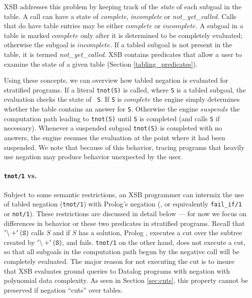 XSB addresses this problem by keeping track of the {\em state} of each
subgoal in the table.  A call can have a state of {\em complete}, {\em
incomplete} or {\em not\_yet\_called}.  
Calls that do have table entries may be either $complete$ or
$incomplete$.  A subgoal in a table is marked $complete$ only after it
is determined to be completely evaluated; otherwise the subgoal is
$incomplete$.  If a tabled subgoal is not present in the table, it is
termed {\em not\_yet\_called}.  XSB contains predicates that allow a
user to examine the state of a given table (Section
\ref{tabling_predicates}).

Using these concepts, we can overview how tabled negation is evaluated
for stratified programs.  If a literal {\tt tnot(S)} is called, where
{\tt S} is a tabled subgoal, the evaluation checks the state of {\tt
S}.  If {\tt S} is $complete$ the engine simply determines whether the
table contains an answer for {\tt S}.  Otherwise the engine $suspends$
the computation path leading to {\tt tnot(S)} until {\tt S} is
completed (and calls {\tt S} if necessary).  Whenever a suspended
subgoal {\tt tnot(S)} is completed with no answers, the engine resumes
the evaluation at the point where it had been suspended.  We note that
because of this behavior, tracing programs that heavily use negation
may produce behavior unexpected by the user.


\paragraph*{{\tt tnot/1} vs. \not }
\index{\not}

Subject to some semantic restrictions, an XSB programmer can intermix
the use of tabled negation ({\tt tnot/1}) with Prolog's negation
(\not, or equivalently {\tt fail\_if/1} or {\tt not/1}).  These
restrictions are discussed in detail below --- for now we focus on
differences in behavior or these two predicates in stratified
programs.  Recall that ${\tt '\backslash+'(S)}$ calls $S$ and if $S$
has a solution, Prolog , executes a cut over the subtree created by
${\tt '\backslash+'(S)}$, and fails.  {\tt tnot/1} on the other hand,
does not execute a cut, so that all subgoals in the computation path
begun by the negative call will be completely evaluated.  The major
reason for not executing the cut is to insure that XSB evaluates
ground queries to Datalog programs with negation with polynomial data
complexity.  As seen in Section \ref{sec:cuts}, this property cannot
be preserved if negation ``cuts'' over tables.

